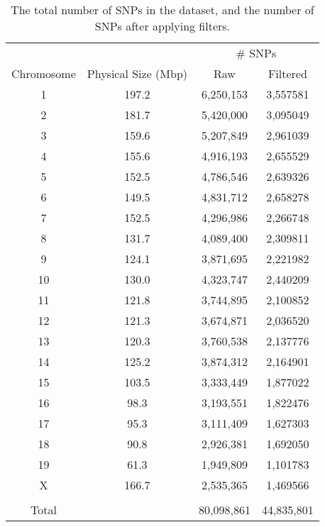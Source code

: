 
\begin{table}
\caption{The total number of SNPs in the dataset, and the number of SNPs after applying filters.}
\begin{tabular} {c c c c} \\ [ 0.5ex ] \hline
 &  & \multicolumn{2}{c}{\# SNPs} \\
Chromosome & Physical Size (Mbp) & Raw & Filtered \\ \hline
1 & 197.2 & 6,250,153 & 3,557581 \\
2 & 181.7 & 5,420,000 & 3,095049 \\
3 & 159.6 & 5,207,849 & 2,961039 \\ 
4 & 155.6 & 4,916,193 & 2,655529 \\
5 & 152.5 & 4,786,546 & 2,639326 \\
6 & 149.5 & 4,831,712 & 2,658278 \\ 
7 & 152.5 & 4,296,986 & 2,266748 \\
8 & 131.7 & 4,089,400 & 2,309811 \\
9 & 124.1 & 3,871,695 & 2,221982 \\ 
10 & 130.0 & 4,323,747 & 2,440209 \\ 
11 & 121.8 & 3,744,895 & 2,100852 \\
12 & 121.3 & 3,674,871 & 2,036520 \\
13 & 120.3 & 3,760,538 & 2,137776 \\
14 & 125.2 & 3,874,312 & 2,164901 \\ 
15 & 103.5 & 3,333,449 & 1,877022\\ 
16 & 98.3 & 3,193,551 & 1,822476 \\
17 & 95.3 & 3,111,409 & 1,627303 \\
18 & 90.8 & 2,926,381 & 1,692050 \\
19 & 61.3 & 1,949,809 & 1,101783 \\
X & 166.7 & 2,535,365 & 1,469566 \\
 &  &  &  \\
Total &  & 80,098,861 & 44,835,801 \\ \hline



\end{tabular}
 \label{tab:C2ST3}

\end{table}

